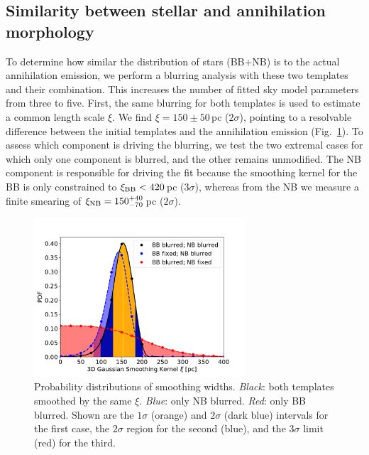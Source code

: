 \documentclass[doublespace,nopageskip]{VTthesis} %
\begin{document}
\subsection{Similarity between stellar and annihilation morphology}\label{sec:blurring_analysis}
%
To determine how similar the distribution of stars (BB+NB) is to the actual annihilation emission, we perform a blurring analysis with these two templates and their combination.
%
This increases the number of fitted sky model parameters from three to five.
%
First, the same blurring for both templates is used to estimate a common length scale $\xi$.
%
We find $\xi = 150 \pm 50$\,pc ($2\sigma$), pointing to a resolvable difference between the initial templates and the annihilation emission (Fig. \,\ref{fig:blur}).
%
To assess which component is driving the blurring, we test the two extremal cases for which only one component is blurred, and the other remains unmodified.
%
The NB component is responsible for driving the fit because the smoothing kernel for the BB is only constrained to $\xi_{\rm BB} < 420$\,pc ($3\sigma$), whereas from the NB we measure a finite smearing of $\xi_{\rm NB} = 150^{+40}_{-70}$\,pc ($2\sigma$).

\begin{figure}[htb]
	\centering
	\includegraphics[width=0.7\textwidth,trim=0.0in 0.15in 0.4in 0.7in, clip=True]{Figures/511keV/Blurred_bulges3D_PDF_comparison.pdf}
	\caption{Probability distributions of smoothing widths. \textit{Black}: both templates smoothed by the same $\xi$. \textit{Blue}: only NB blurred. \textit{Red}: only BB blurred. Shown are the $1\sigma$ (orange) and $2\sigma$ (dark blue) intervals for the first case, the $2\sigma$ region for the second (blue), and the $3\sigma$ limit (red) for the third.} 
	\label{fig:blur}
\end{figure}
\end{document}

